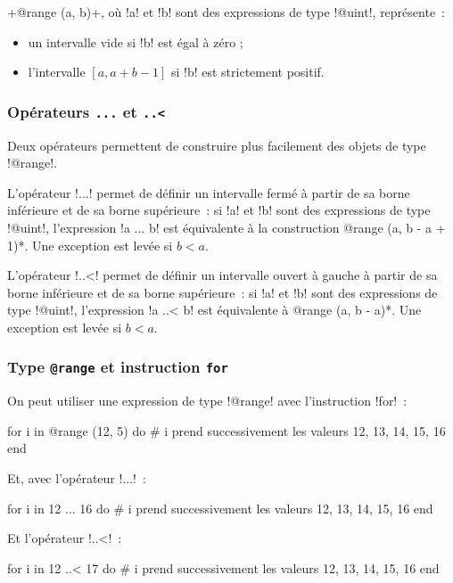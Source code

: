 \ggsq+@range (a, b)+, où \ggsq!a! et \ggsq!b! sont des expressions de type \ggsq!@uint!, représente~:
\begin{itemize}
  \item un intervalle vide si \ggsq!b! est égal à zéro ;
  \item l'intervalle $[a, a+b-1]$ si \ggsq!b! est strictement positif.
\end{itemize}



\subsubsection{Opérateurs \texttt{.{}.{}.} et \texttt{.{}.{}<}}

Deux opérateurs permettent de construire plus facilement des objets de type \ggsq!@range!.

L'opérateur \ggsq!...! permet de définir un intervalle fermé à partir de sa borne inférieure et de sa borne supérieure~: si \ggsq!a! et \ggsq!b! sont des expressions de type \ggsq!@uint!, l'expression \ggsq!a ... b! est équivalente à la construction \ggsq*@range (a, b - a + 1)*. Une exception est levée si $b < a$.

L'opérateur \ggsq!..<! permet de définir un intervalle ouvert à gauche à partir de sa borne inférieure et de sa borne supérieure~: si \ggsq!a! et \ggsq!b! sont des expressions de type \ggsq!@uint!, l'expression \ggsq!a ..< b! est équivalente à \ggsq*@range (a, b - a)*. Une exception est levée si $b < a$.

\subsubsection{Type \texttt{@range} et instruction \texttt{for}}

On peut utiliser une expression de type \ggsq!@range! avec l'instruction \ggsq!for!~:

\begin{galgas34}
for i in @range (12, 5) do
  # i prend successivement les valeurs 12, 13, 14, 15, 16
end
\end{galgas34}

Et, avec l'opérateur \ggsq!...!~:
\begin{galgas34}
for i in 12 ... 16 do
  # i prend successivement les valeurs 12, 13, 14, 15, 16
end
\end{galgas34}

Et l'opérateur \ggsq!..<!~:
\begin{galgas34}
for i in 12 ..< 17 do
  # i prend successivement les valeurs 12, 13, 14, 15, 16
end
\end{galgas34}

